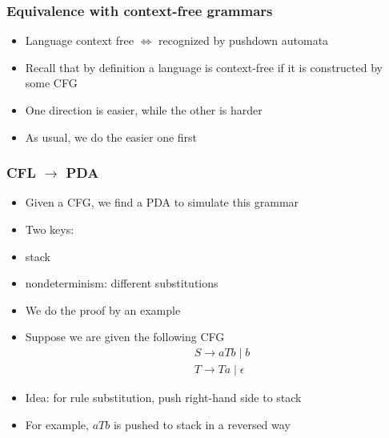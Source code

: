 




\begin{frame}[allowframebreaks] \frametitle{Equivalence with context-free grammars}
  \begin{itemize}  
\item Language context free
$\Leftrightarrow$ recognized by pushdown automata

\item Recall that by definition a language is context-free if
  it is constructed by some CFG
\item One direction is easier, while the other is harder
\item As usual, we do the easier one first
  
\end{itemize}\end{frame} \begin{frame}[allowframebreaks] \frametitle{CFL $\rightarrow$ PDA}
    \begin{itemize}
    \item Given a CFG, we find a PDA to simulate this grammar
      
\item Two keys:

\item [] stack 

\item [] nondeterminism: different substitutions

  
\item We do the proof by an example
\item Suppose we are given the following
  CFG
  \begin{equation*}
    \begin{split}
      & S \rightarrow aTb \mid b\\
      & T \rightarrow Ta \mid \epsilon
    \end{split}
  \end{equation*}

\item Idea: for rule substitution, push right-hand side to stack

\item [] For example, $aTb$ is pushed to stack in a reversed way


\end{itemize}
\end{frame}

